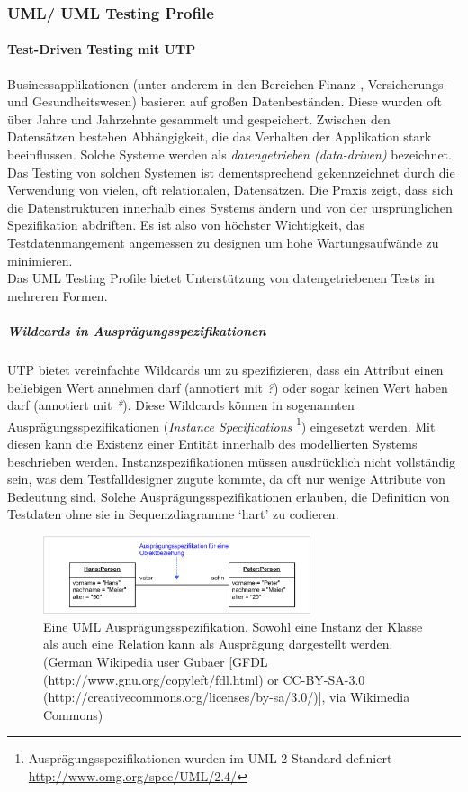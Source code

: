 \subsubsection{UML/ UML Testing Profile}
\paragraph{Test-Driven Testing mit UTP}
Businessapplikationen (unter anderem in den Bereichen Finanz-, Versicherungs- und Gesundheitswesen) basieren auf großen Datenbeständen. Diese wurden oft über Jahre und Jahrzehnte gesammelt und gespeichert. Zwischen den Datensätzen bestehen Abhängigkeit, die das Verhalten der Applikation stark beeinflussen. Solche Systeme werden als \textit{datengetrieben (data-driven)} bezeichnet. Das Testing von solchen Systemen ist dementsprechend gekennzeichnet durch die Verwendung von vielen, oft relationalen, Datensätzen. Die Praxis zeigt, dass sich die Datenstrukturen innerhalb eines Systems ändern und von der ursprünglichen Spezifikation abdriften. Es ist also von höchster Wichtigkeit, das Testdatenmangement angemessen zu designen um hohe Wartungsaufwände zu minimieren.\cite{baker_model-driven_2005}\\
Das UML Testing Profile bietet Unterstützung von datengetriebenen Tests in mehreren Formen.

\subparagraph{Wildcards in Ausprägungsspezifikationen}
UTP bietet vereinfachte Wildcards um zu spezifizieren, dass ein Attribut einen beliebigen Wert annehmen darf (annotiert mit \textit{?}) oder sogar keinen Wert haben darf (annotiert mit \textit{*}). Diese Wildcards können in sogenannten Ausprägungsspezifikationen (\textit{Instance Specifications} \footnote{Ausprägungsspezifikationen wurden im UML 2 Standard definiert \url{http://www.omg.org/spec/UML/2.4/} }) eingesetzt werden. Mit diesen kann die Existenz einer Entität innerhalb des modellierten Systems beschrieben werden. Instanzspezifikationen müssen ausdrücklich nicht vollständig sein, was dem Testfalldesigner zugute kommte, da oft nur wenige Attribute von Bedeutung sind. Solche Ausprägungsspezifikationen erlauben, die Definition von Testdaten ohne sie in Sequenzdiagramme `hart' zu codieren.

\begin{figure}[h] 
  \centering
     \includegraphics[width=0.7\textwidth]{figures/uml_instance.png}
  \caption{Eine UML Ausprägungsspezifikation. Sowohl eine Instanz der Klasse als auch eine Relation kann als Ausprägung dargestellt werden. (German Wikipedia user Gubaer [GFDL (http://www.gnu.org/copyleft/fdl.html) or CC-BY-SA-3.0 (http://creativecommons.org/licenses/by-sa/3.0/)], via Wikimedia Commons)}
  \label{fig:uml_instance}
\end{figure}